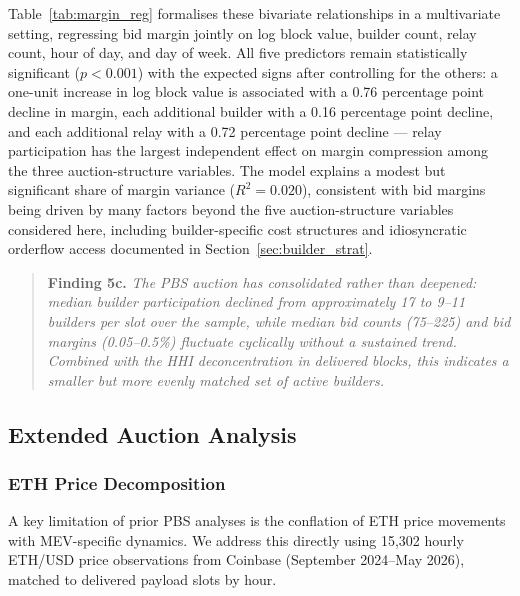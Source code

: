 \documentclass[11pt]{article}
\begin{document}
Table~\ref{tab:margin_reg} formalises these bivariate relationships in a
multivariate setting, regressing bid margin jointly on log block value,
builder count, relay count, hour of day, and day of week. All five
predictors remain statistically significant ($p < 0.001$) with the expected
signs after controlling for the others: a one-unit increase in log block
value is associated with a 0.76 percentage point decline in margin, each
additional builder with a 0.16 percentage point decline, and each additional
relay with a 0.72 percentage point decline --- relay participation has the
largest independent effect on margin compression among the three
auction-structure variables. The model explains a modest but
significant share of margin variance ($R^2 = 0.020$), consistent with bid
margins being driven by many factors beyond the five auction-structure
variables considered here, including builder-specific cost structures and
idiosyncratic orderflow access documented in Section~\ref{sec:builder_strat}.

\begin{quote}
\textbf{Finding 5c.} \textit{The PBS auction has consolidated rather than
deepened: median builder participation declined from approximately 17 to
9--11 builders per slot over the sample, while median bid counts (75--225)
and bid margins (0.05--0.5\%) fluctuate cyclically without a sustained
trend. Combined with the HHI deconcentration in delivered blocks, this
indicates a smaller but more evenly matched set of active builders.}
\end{quote}



\subsection{Extended Auction Analysis}
\label{sec:extended_auction}

\subsubsection{ETH Price Decomposition}
\label{sec:eth_decomp_sec}

A key limitation of prior PBS analyses is the conflation of ETH price
movements with MEV-specific dynamics. We address this directly using 15,302
hourly ETH/USD price observations from Coinbase (September 2024--May 2026),
matched to delivered payload slots by hour.
\end{document}
